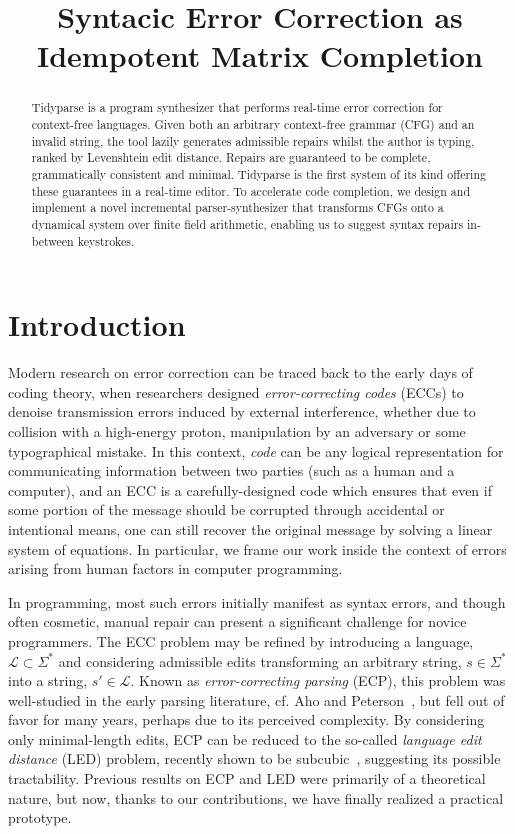 \documentclass[sigplan,review,anonymous,acmsmall]{acmart}\settopmatter{printfolios=false,printccs=false,printacmref=false}
\begin{document}
    \title{Syntacic Error Correction as Idempotent Matrix Completion}
    \begin{abstract}
        Tidyparse is a program synthesizer that performs real-time error correction for context-free languages.
        Given both an arbitrary context-free grammar (CFG) and an invalid string, the tool lazily generates admissible repairs whilst the author is typing, ranked by Levenshtein edit distance. Repairs are guaranteed to be complete, grammatically consistent and minimal.
        Tidyparse is the first system of its kind offering these guarantees in a real-time editor. To accelerate code completion, we design and implement a novel incremental parser-synthesizer that transforms CFGs onto a dynamical system over finite field arithmetic, enabling us to suggest syntax repairs in-between keystrokes.
    \end{abstract}


    \maketitle

    \section{Introduction}

    Modern research on error correction can be traced back to the early days of coding theory, when researchers designed \textit{error-correcting codes} (ECCs) to denoise transmission errors induced by external interference, whether due to collision with a high-energy proton, manipulation by an adversary or some typographical mistake. In this context, \textit{code} can be any logical representation for communicating information between two parties (such as a human and a computer), and an ECC is a carefully-designed code which ensures that even if some portion of the message should be corrupted through accidental or intentional means, one can still recover the original message by solving a linear system of equations. In particular, we frame our work inside the context of errors arising from human factors in computer programming.

    In programming, most such errors initially manifest as syntax errors, and though often cosmetic, manual repair can present a significant challenge for novice programmers. The ECC problem may be refined by introducing a language, $\mathcal{L} \subset \Sigma^*$ and considering admissible edits transforming an arbitrary string, $s \in \Sigma^*$ into a string, $s'\in\mathcal{L}$. Known as \textit{error-correcting parsing} (ECP), this problem was well-studied in the early parsing literature, cf. Aho and Peterson~\cite{aho1972minimum}, but fell out of favor for many years, perhaps due to its perceived complexity. By considering only minimal-length edits, ECP can be reduced to the so-called \textit{language edit distance} (LED) problem, recently shown to be subcubic~\cite{bringmann2019truly}, suggesting its possible tractability. Previous results on ECP and LED were primarily of a theoretical nature, but now, thanks to our contributions, we have finally realized a practical prototype.
\end{document}
